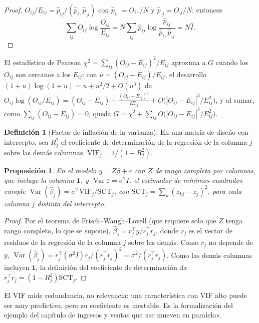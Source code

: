 \documentclass[11pt,a4paper]{article}
\theoremstyle{plain}
\newtheorem{proposicion}[teorema]{Proposición}
\theoremstyle{definition}
\newtheorem{definicion}[teorema]{Definición}
\theoremstyle{remark}
\newcommand{\Var}{\operatorname{Var}}
\newcommand{\1}{\mathbf{1}}
\begin{document}
\begin{proof}
$O_{ij}/E_{ij}=\hat p_{ij}/(\hat p_{i\cdot}\hat p_{\cdot j})$ con
$\hat p_{i\cdot}=O_{i\cdot}/N$ y $\hat p_{\cdot j}=O_{\cdot j}/N$; entonces
\[
\sum_{ij}O_{ij}\log\frac{O_{ij}}{E_{ij}}=N\sum_{ij}\hat p_{ij}\log\frac{\hat
p_{ij}}{\hat p_{i\cdot}\hat p_{\cdot j}}=N\hat I .
\]
\end{proof}

El estadístico de Pearson $\chi^2=\sum_{ij}(O_{ij}-E_{ij})^2/E_{ij}$
aproxima a $G$ cuando los $O_{ij}$ son cercanos a los $E_{ij}$: con
$u=(O_{ij}-E_{ij})/E_{ij}$, el desarrollo
$(1+u)\log(1+u)=u+u^2/2+O(u^3)$ da
$O_{ij}\log(O_{ij}/E_{ij})=(O_{ij}-E_{ij})+\frac{(O_{ij}-E_{ij})^2}{2E_{ij}}+O\bigl(|O_{ij}-E_{ij}|^3/E_{ij}^2\bigr)$,
y al sumar, como $\sum_{ij}(O_{ij}-E_{ij})=0$, queda
$G=\chi^2+\sum_{ij}O\bigl(|O_{ij}-E_{ij}|^3/E_{ij}^2\bigr)$.

\begin{definicion}[Factor de inflación de la varianza]
En una matriz de diseño con intercepto, sea $R_j^2$ el coeficiente de
determinación de la regresión de la columna $j$ sobre las demás columnas.
$\mathrm{VIF}_j=1/(1-R_j^2)$.
\end{definicion}

\begin{proposicion}
En el modelo $y=Z\beta+\varepsilon$ con $Z$ de rango completo por
columnas, que incluye la columna $\1$, y $\Var\varepsilon=\sigma^2I$, el
estimador de mínimos cuadrados cumple
$\Var(\hat\beta_j)=\sigma^2\,\mathrm{VIF}_j/\mathrm{SCT}_j$, con
$\mathrm{SCT}_j=\sum_k(z_{kj}-\bar z_j)^2$, para cada columna $j$ distinta
del intercepto.
\end{proposicion}

\begin{proof}
Por el teorema de Frisch--Waugh--Lovell (que requiere solo que $Z$ tenga
rango completo, lo que se supone), $\hat\beta_j=r_j^\top y/r_j^\top r_j$,
donde $r_j$ es el vector de residuos de la regresión de la columna $j$
sobre las demás. Como $r_j$ no depende de $y$,
$\Var(\hat\beta_j)=r_j^\top(\sigma^2I)r_j/(r_j^\top r_j)^2=\sigma^2/(r_j^\top
r_j)$. Como las demás columnas incluyen $\1$, la definición del
coeficiente de determinación da $r_j^\top r_j=(1-R_j^2)\mathrm{SCT}_j$.
\end{proof}

El VIF mide redundancia, no relevancia: una característica con VIF alto
puede ser muy predictiva, pero su coeficiente es inestable. Es la
formalización del ejemplo del capítulo de ingresos y ventas que «se mueven
en paralelo».
\end{document}
